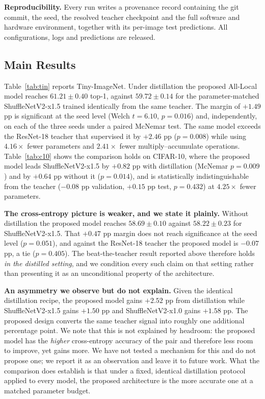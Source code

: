 \textbf{Reproducibility.} Every run writes a provenance record containing the
git commit, the seed, the resolved teacher checkpoint and the full software
and hardware environment, together with its per-image test predictions. All
configurations, logs and predictions are released.

\subsection{Main Results}
\label{sec:main}

Table~\ref{tab:tin} reports Tiny-ImageNet. Under distillation the proposed
All-Local model reaches $61.21 \pm 0.40$ top-1, against $59.72 \pm 0.14$ for
the parameter-matched ShuffleNetV2-x1.5 \cite{shufflenetv2} trained
identically from the same teacher. The margin of $+1.49$ pp is significant at
the seed level (Welch $t = 6.10$, $p = 0.016$) and, independently, on each of
the three seeds under a paired McNemar test. The same model exceeds the
ResNet-18 teacher that supervised it by $+2.46$ pp ($p = 0.008$) while using
$4.16\times$ fewer parameters and $2.41\times$ fewer multiply--accumulate
operations. Table~\ref{tab:c10} shows the comparison holds on CIFAR-10, where
the proposed model leads ShuffleNetV2-x1.5 by $+0.82$ pp with distillation
(McNemar $p = 0.009$) and by $+0.64$ pp without it ($p = 0.014$), and is
statistically indistinguishable from the teacher ($-0.08$ pp validation,
$+0.15$ pp test, $p = 0.432$) at $4.25\times$ fewer parameters.

\textbf{The cross-entropy picture is weaker, and we state it plainly.}
Without distillation the proposed model reaches $58.69 \pm 0.10$ against
$58.22 \pm 0.23$ for ShuffleNetV2-x1.5. That $+0.47$ pp margin does not reach
significance at the seed level ($p = 0.051$), and against the ResNet-18
teacher the proposed model is $-0.07$ pp, a tie ($p = 0.405$). The
beat-the-teacher result reported above therefore holds \emph{in the distilled
setting}, and we condition every such claim on that setting rather than
presenting it as an unconditional property of the architecture.

\textbf{An asymmetry we observe but do not explain.} Given the identical
distillation recipe, the proposed model gains $+2.52$ pp from distillation
while ShuffleNetV2-x1.5 gains $+1.50$ pp and ShuffleNetV2-x1.0 gains $+1.58$
pp. The proposed design converts the same teacher signal into roughly one
additional percentage point. We note that this is not explained by headroom:
the proposed model has the \emph{higher} cross-entropy accuracy of the pair
and therefore less room to improve, yet gains more. We have not tested a
mechanism for this and do not propose one; we report it as an observation and
leave it to future work. What the comparison does establish is that under a
fixed, identical distillation protocol applied to every model, the proposed
architecture is the more accurate one at a matched parameter budget.

